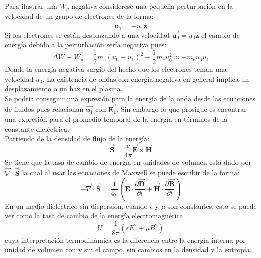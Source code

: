Para ilustrar una $W_p$ negativa considerese una pequeña perturbación en la velocidad de un grupo de electrones de la forma:
\begin{equation}
\overrightarrow{\textbf{u}_1}=-u_1\widehat{\textbf{z}}
\end{equation}
Si los electrones se están desplazando a una velocidad $\overrightarrow{\textbf{u}_0}=u_0\widehat{\textbf{z}}$ el cambio de energía debido a la perturbación sería negativa pues:
\begin{equation}
\Delta W \equiv W_p = \frac{1}{2}m_e(u_0-u_1)^2-\frac{1}{2}m_eu_0^2\approx-m_eu_0u_1
\end{equation}
Donde la energía negativa surgio del hecho que los electrones tenían una velocidad $u_0$. La existencia de ondas con energía negativa en general implica un desplazamiento o un haz en el plasma.\\
Se podría conseguir una expresión para la energía de la onda desde las ecuaciones de fluidos pues relacionan $\overrightarrow{\textbf{u}_1}$ con $\overrightarrow{\textbf{E}_1}$. Sin embargo lo que prosigue es encontrar una expresión para el promedio temporal de la energía en términos de la constante dieléctrica.\\
Partiendo de la densidad de flujo de la energía:
\begin{equation}
\overrightarrow{\textbf{S}}= \frac{c}{4 \pi}\overrightarrow{\textbf{E}}\times \overrightarrow{\textbf{H}}
\end{equation}
Se tiene que la tasa de cambio de energía en unidades de volumen está dado por $\overrightarrow{\nabla} \cdot \overrightarrow{\textbf{S}}$ la cual al usar las ecuaciones de Maxwell se puede escribir de la forma:
\begin{equation}
\label{eq:tasa_cambio_energia_em_por_volumen}
-\overrightarrow{\nabla} \cdot \overrightarrow{\textbf{S}}= \frac{1}{4 \pi}\left(\overrightarrow{\textbf{E}}\cdot \frac{\partial \overrightarrow{\textbf{D}}}{\partial t} + \overrightarrow{\textbf{H}}\cdot \frac{\partial \overrightarrow{\textbf{B}}}{\partial t} \right)
\end{equation}
En un medio dieléctrico sin dispersión, cuando $\epsilon$ y $\mu$ son constantes, esto se puede ver como la tasa de cambio de la energía electromagnética
\begin{equation}
U = \frac{1}{8\pi}\left(\epsilon E^2 +\mu B^2\right)
\end{equation}
cuya interpretación termodinámica es la diferencia entre la energía interna por unidad de volumen con y sin el campo, sin cambios en la densidad y la entropía. \cite{Landau1690Electro_media}\\
